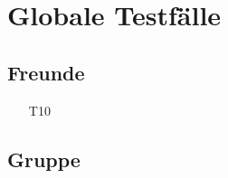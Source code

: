 \documentclass[parskip=full]{scrartcl}
\begin{document}
	\section{Globale Testfälle}
	
	\subsection{Freunde}
		
		\begin{itemize}
			\item[T10]
		\end{itemize}
	
	
	\subsection{Gruppe}
	
\end{document}
